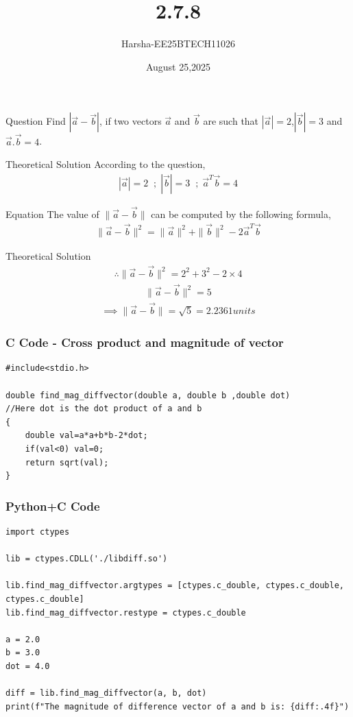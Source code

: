 \documentclass{beamer}
\title %
{2.7.8}
\date{August 25,2025}
\author %
{Harsha-EE25BTECH11026}
\begin{document}
\frame{\titlepage}
\begin{frame}{Question}
Find $|\vec{a}-\vec{b}|$, if two vectors $\vec{a}$ and $\vec{b}$ are such that $|\vec{a}|=2$,$|\vec{b}|=3$ and $\vec{a}.\vec{b}=4$.
\end{frame}



\begin{frame}{Theoretical Solution}
According to the question,\\
\begin{align}
    |\vec{a}|=2 \;\; ; \; |\vec{b}|=3 \;\; ;\; \vec{a}^T\vec{b}=4
\end{align}
\end{frame}

\begin{frame}{Equation}
The  value of $\|\vec{a}-\vec{b}\|$ can be computed by the following formula,
\begin{align}
    \|\vec{a}-\vec{b}\|^2=\|\vec{a}\|^2+\|\vec{b}\|^2-2\vec{a}^T\vec{b}
\end{align}
\end{frame}

\begin{frame}{Theoretical Solution}
\begin{align}
    \therefore \|\vec{a}-\vec{b}\|^2=2^2+3^2-2\times4
\end{align}
\begin{align}
    \|\vec{a}-\vec{b}\|^2=5
\end{align}
\begin{align}
    \implies \|\vec{a}-\vec{b}\|=\sqrt{5}=2.2361 units
\end{align}

\end{frame}



\begin{frame}[fragile]
    \frametitle{C Code - Cross product and magnitude of vector}

    \begin{lstlisting}
#include<stdio.h>

double find_mag_diffvector(double a, double b ,double dot)
//Here dot is the dot product of a and b
{
	double val=a*a+b*b-2*dot;
	if(val<0) val=0;
	return sqrt(val);
}
    \end{lstlisting}
\end{frame}



\begin{frame}[fragile]
    \frametitle{Python+C Code}
    \begin{lstlisting}
import ctypes

lib = ctypes.CDLL('./libdiff.so')

lib.find_mag_diffvector.argtypes = [ctypes.c_double, ctypes.c_double, ctypes.c_double]
lib.find_mag_diffvector.restype = ctypes.c_double

a = 2.0
b = 3.0
dot = 4.0

diff = lib.find_mag_diffvector(a, b, dot)
print(f"The magnitude of difference vector of a and b is: {diff:.4f}")

    \end{lstlisting}
\end{frame}
\end{document}
